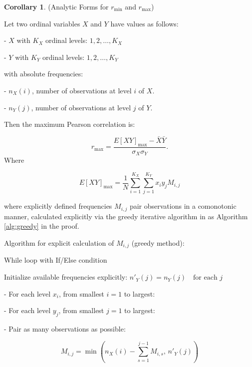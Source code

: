 \documentclass[
  12pt,
]{article}
\theoremstyle{plain}
\theoremstyle{definition}
\newtheorem{corollary}{Corollary}
\theoremstyle{remark}
\begin{document}
\begin{corollary} {(Analytic Forms for $r_{\min}$ and $r_{\max}$)}


Let two ordinal variables $X$ and $Y$ have values as follows:

- $X$ with $K_X$ ordinal levels: $1,2,\dots,K_X$
    
- $Y$ with $K_Y$ ordinal levels: $1,2,\dots,K_Y$
    
with absolute frequencies:

- $n_{X}(i)$, number of observations at level $i$ of $X$.
    
- $n_{Y}(j)$, number of observations at level $j$ of $Y$.
    

Then the maximum Pearson correlation is:

$$r_{\text{max}} = \frac{E[XY]_{\text{max}} - \bar{X}\bar{Y}}{\sigma_X \sigma_Y}.$$
Where 

$$
E[XY]_{\max} =\frac{1}{N}\sum_{i=1}^{K_X}\sum_{j=1}^{K_Y}x_i y_j M_{i,j}
$$

where explicitly defined frequencies $M_{i,j}$ pair observations in a comonotonic manner, calculated explicitly via the greedy iterative algorithm in as Algorithm  \ref{alg:greedy} in the proof.




Algorithm for explicit calculation of $M_{i,j}$ (greedy method):



\begin{algorithm}[H]
\DontPrintSemicolon
\SetAlgoLined
{}
\BlankLine
{}
\caption{While loop with If/Else condition}
\label{alg:greedy}

Initialize available frequencies explicitly:  $n'_Y(j)=n_Y(j)\quad\text{for each }j$

- For each level $x_i$, from smallest $i=1$ to largest:
    
    - For each level $y_j$, from smallest $j=1$ to largest:
        
        - Pair as many observations as possible:
            

$$M_{i,j}=\min\left(n_X(i)-\sum_{s=1}^{j-1}M_{i,s},\, n'_Y(j)\right)$$


\end{algorithm}
\end{corollary}
\end{document}
